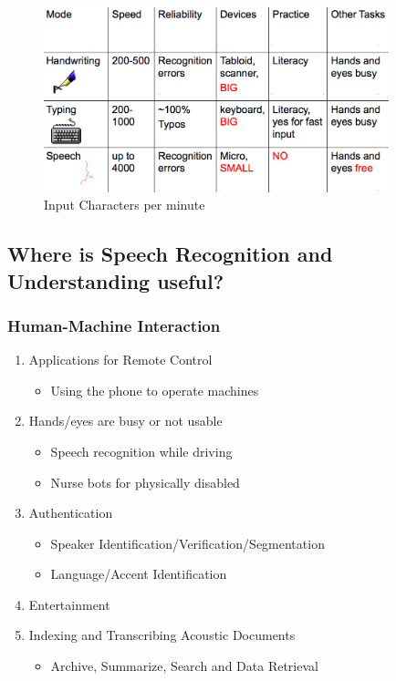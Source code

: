 \documentclass[11pt]{article}
\begin{document}
\begin{figure}[ht]
\centering
\includegraphics[width=10cm]{images/Input.png}
\caption{Input Characters per minute}
\label{fig:inputCharacters}
\end{figure}

\subsection{Where is Speech Recognition and Understanding useful?}
\subsubsection{Human-Machine Interaction}
\begin{enumerate}
\item Applications for Remote Control
\begin{itemize}
\item Using the phone to operate machines
\end{itemize}

\item Hands/eyes are busy or not usable
\begin{itemize}
\item Speech recognition while driving
\item Nurse bots for physically disabled
\end{itemize}

\item Authentication
\begin{itemize}
\item Speaker Identification/Verification/Segmentation
\item Language/Accent Identification
\end{itemize}

\item Entertainment

\item Indexing and Transcribing Acoustic Documents
\begin{itemize}
\item Archive, Summarize, Search and Data Retrieval
\end{itemize}

\end{enumerate}
\end{document}
